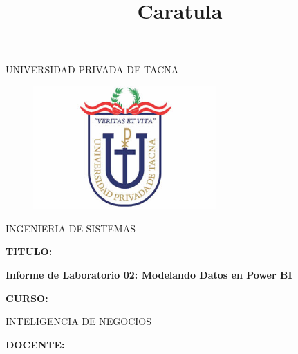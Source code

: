\documentclass[12pt,letterpaper]{article}
\begin{document}
\title{Caratula}

\begin{titlepage}
\begin{center}
\large{UNIVERSIDAD PRIVADA DE TACNA}\\
\vspace*{-0.025in}
\begin{figure}[htb]
\begin{center}
\includegraphics[width=7cm]{./images/logo}
\end{center}
\end{figure}
\vspace*{0.15in}
INGENIERIA DE SISTEMAS  \\

\vspace*{0.3in}
\begin{large}
\textbf{TITULO:} \\
\end{large}

\vspace*{0.1in}
\begin{Large}
\textbf{Informe de Laboratorio 02: Modelando Datos en Power BI} \\

\end{Large}

\vspace*{0.3in}
\begin{Large}
\textbf{CURSO:} \\
\end{Large}

\vspace*{0.1in}
\begin{large}
INTELIGENCIA DE NEGOCIOS\\
\end{large}

\vspace*{0.3in}
\begin{Large}
\textbf{DOCENTE:} \\
\end{Large}


\end{center}
\end{titlepage}
\end{document}
